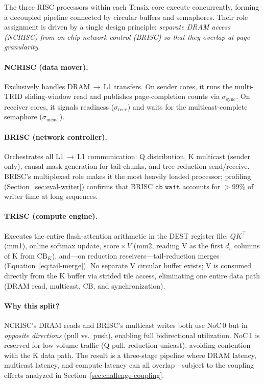 \documentclass[sigconf, review, anonymous]{acmart}
\begin{document}
The three RISC processors within each Tensix core execute
concurrently, forming a decoupled pipeline connected by circular
buffers and semaphores.
Their role assignment is driven by a single design principle:
\emph{separate DRAM access (NCRISC) from on-chip network control
(BRISC) so that they overlap at page granularity}.

\paragraph{NCRISC (data mover).}
Exclusively handles DRAM$\,\to\,$L1 transfers.  On sender cores, it
runs the multi-TRID sliding-window read and publishes page-completion
counts via $\sigma_{\mathrm{sync}}$.
On receiver cores, it signals readiness ($\sigma_{\mathrm{recv}}$)
and waits for the multicast-complete semaphore
($\sigma_{\mathrm{mcast}}$).

\paragraph{BRISC (network controller).}
Orchestrates all L1$\,\to\,$L1 communication: Q distribution,
K multicast (sender only), causal mask generation for tail chunks,
and tree-reduction send/receive.  BRISC's multiplexed role makes it
the most heavily loaded processor; profiling
(Section~\ref{sec:eval-writer}) confirms that BRISC
$\texttt{cb\_wait}$ accounts for $>$99\% of writer time at long
sequences.

\paragraph{TRISC (compute engine).}
Executes the entire flash-attention arithmetic in the DEST register
file: $QK^\top$ (mm1), online softmax update, $\mathrm{score} \times V$
(mm2, reading V as the first $d_v$ columns of K from $\mathrm{CB}_K$),
and---on reduction receivers---tail-reduction merges
(Equation~\ref{eq:tail-merge}).
No separate V circular buffer exists; V is consumed directly from the
K buffer via strided tile access, eliminating one entire data path
(DRAM read, multicast, CB, and synchronization).

\paragraph{Why this split?}
NCRISC's DRAM reads and BRISC's multicast writes both use NoC\,0 but
in \emph{opposite directions} (pull vs.\ push), enabling full
bidirectional utilization.  NoC\,1 is reserved for low-volume traffic
(Q pull, reduction unicast), avoiding contention with the K data
path.  The result is a three-stage pipeline where DRAM latency,
multicast latency, and compute latency can all overlap---subject to
the coupling effects analyzed in Section~\ref{sec:challenge-coupling}.
\end{document}
